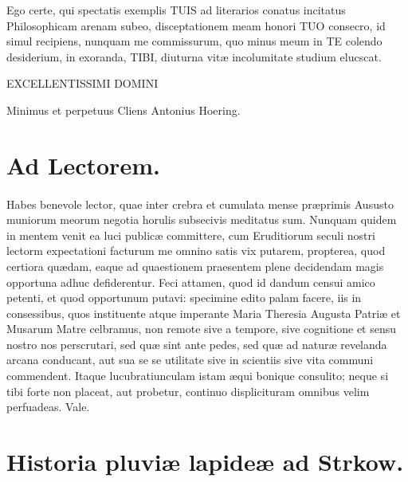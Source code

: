 \documentclass[a4paper, 11pt, oneside, polutonikogreek, latin]{article}
\begin{document}
Ego certe, qui spectatis exemplis TUIS ad literarios conatus incitatus Philosophicam arenam subeo, disceptationem meam honori TUO consecro, id simul recipiens, nunquam me commissurum, quo minus meum in TE colendo desiderium, in exoranda, TIBI, diuturna vitæ incolumitate studium elucscat.
\begin{center}
EXCELLENTISSIMI DOMINI
\end{center}
\begin{center}
Minimus et perpetuus Cliens Antonius Hoering.
\end{center}
\clearpage
\section{Ad Lectorem.}
\paragraph{}
Habes benevole lector, quae inter crebra et cumulata mense præprimis Aususto muniorum meorum negotia horulis subsecivis meditatus sum. Nunquam quidem in mentem venit ea luci publicæ committere, cum Eruditiorum seculi nostri lectorm expectationi facturum me omnino satis vix putarem, propterea, quod certiora quædam, eaque ad quaestionem praesentem plene decidendam magis opportuna adhuc defiderentur. Feci attamen, quod id dandum censui amico petenti, et quod opportunum putavi: specimine edito palam facere, iis in consessibus, quos instituente atque imperante Maria Theresia Augusta Patriæ et Musarum Matre celbramus, non remote sive a tempore, sive cognitione et sensu nostro nos perscrutari, sed quæ sint ante pedes, sed quæ ad naturæ revelanda arcana conducant, aut sua se se utilitate sive in scientiis sive vita communi commendent. Itaque lucubratiunculam istam æqui bonique consulito; neque si tibi forte non placeat, aut probetur, continuo displicituram omnibus velim perfuadeas. Vale.
\clearpage
\section{Historia pluviæ lapideæ ad Strkow.}
\end{document}
